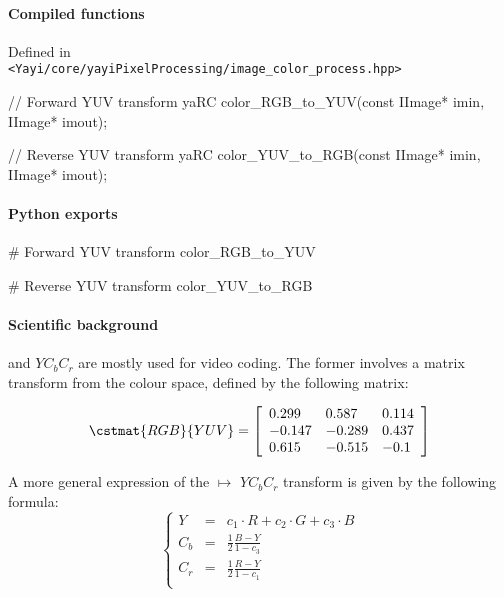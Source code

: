 \paragraph{Compiled functions} Defined in \\
\lstinline|<Yayi/core/yayiPixelProcessing/image_color_process.hpp>|
\begin{cpp}
// Forward YUV transform
yaRC color_RGB_to_YUV(const IImage* imin, IImage* imout);

// Reverse YUV transform
yaRC color_YUV_to_RGB(const IImage* imin, IImage* imout);
\end{cpp}


\paragraph{Python exports} 
\begin{python}
# Forward YUV transform
color_RGB_to_YUV

# Reverse YUV transform
color_YUV_to_RGB
\end{python}


\paragraph{Scientific background}
\YUV and $YC_bC_r$ are mostly used for video coding. The former involves a matrix transform from the \RGB colour space, defined by the following matrix:

\begin{equation}
\cstmat{RGB}{YUV}= \left[
    \begin{array}{lll}
      0.299 & 0.587 & 0.114 \\
      -0.147 & -0.289 & 0.437 \\
      0.615 & -0.515 & -0.1
     \end{array}
	\right] 
\label{equ:RGB2YUV}
\end{equation}

A more general expression of the \RGB $\mapsto$ $YC_{b}C_{r}$ transform is given by the following formula:
\begin{equation}
    \left\{ 
        \begin{array}{lll}
Y    &= &c_1 \cdot R + c_2 \cdot G + c_3 \cdot B \\
C_{b}&= &\frac{1}{2}\frac{B - Y}{1 - c_3} \\
C_{r}&= &\frac{1}{2}\frac{R - Y}{1 - c_1} \\
        \end{array}
    \right.
	\label{equ:RGB2YCbCr}
\end{equation}

